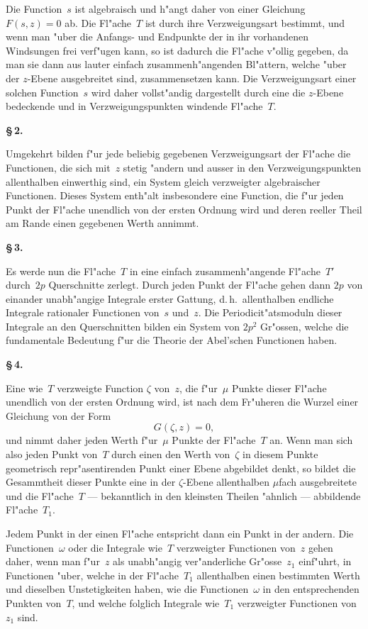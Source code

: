 \documentclass[12pt,a4paper]{article}
\begin{document}
Die Function~$s$ ist algebraisch und h"angt daher von einer Gleichung
$F(s,z) = 0$ ab. Die Fl"ache~$T$ ist durch ihre Verzweigungsart bestimmt,
und wenn man "uber die Anfangs- und Endpunkte der in ihr vorhandenen
Windsungen frei verf"ugen kann, so ist dadurch die Fl"ache v"ollig
gegeben, da man sie dann aus lauter einfach zusammenh"angenden
Bl"attern, welche "uber der $z$-Ebene ausgebreitet sind, zusammensetzen
kann. Die Verzweigungsart einer solchen Function~$s$ wird daher
vollst"andig dargestellt durch eine die $z$-Ebene bedeckende und in
Verzweigungspunkten windende Fl"ache~$T$.

\medskip
\textbf{\S\,2.}

Umgekehrt bilden f"ur jede beliebig gegebenen Verzweigungsart der
Fl"ache die Functionen, die sich mit~$z$ stetig "andern und ausser in den
Verzweigungspunkten allenthalben einwerthig sind, ein System gleich
verzweigter algebraischer Functionen. Dieses System enth"alt insbesondere
eine Function, die f"ur jeden Punkt der Fl"ache unendlich von der ersten
Ordnung wird und deren reeller Theil am Rande einen gegebenen Werth
annimmt.

\medskip
\textbf{\S\,3.}

Es werde nun die Fl"ache~$T$ in eine einfach zusammenh"angende
Fl"ache~$T'$ durch~$2p$ Querschnitte zerlegt. Durch jeden Punkt der
Fl"ache gehen dann $2p$ von einander unabh"angige Integrale erster
Gattung, d.\,h.\ allenthalben endliche Integrale rationaler Functionen
von~$s$ und~$z$. Die Periodicit"atsmoduln dieser Integrale an den
Querschnitten bilden ein System von $2p^2$ Gr"ossen, welche die fundamentale
Bedeutung f"ur die Theorie der Abel'schen Functionen haben.

\medskip
\textbf{\S\,4.}

Eine wie~$T$ verzweigte Function $\zeta$ von~$z$, die f"ur~$\mu$ Punkte dieser
Fl"ache unendlich von der ersten Ordnung wird, ist nach dem Fr"uheren
die Wurzel einer Gleichung von der Form
\[
G(\zeta, z) = 0,
\]
und nimmt daher jeden Werth f"ur~$\mu$ Punkte der Fl"ache~$T$ an.
Wenn man sich also jeden Punkt von~$T$ durch einen den Werth
von~$\zeta$ in diesem Punkte geometrisch repr"asentirenden Punkt einer
Ebene abgebildet denkt, so bildet die Gesammtheit dieser Punkte eine
in der $\zeta$-Ebene allenthalben $\mu$fach ausgebreitete und die Fl"ache~$T$
--- bekanntlich in den kleinsten Theilen "ahnlich --- abbildende
Fl"ache~$T_1$.

Jedem Punkt in der einen Fl"ache entspricht dann ein Punkt in der
andern. Die Functionen~$\omega$ oder die Integrale wie~$T$ verzweigter
Functionen von~$z$ gehen daher, wenn man f"ur~$z$ als unabh"angig
ver"anderliche Gr"osse~$z_1$ einf"uhrt, in Functionen "uber, welche in der
Fl"ache~$T_1$ allenthalben einen bestimmten Werth und dieselben
Unstetigkeiten haben, wie die Functionen~$\omega$ in den entsprechenden
Punkten von~$T$, und welche folglich Integrale wie~$T_1$ verzweigter
Functionen von~$z_1$ sind.
\end{document}
